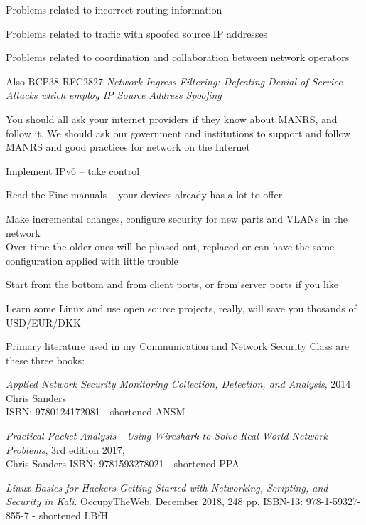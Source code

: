\documentclass[Screen16to9,17pt]{foils}
\begin{document}
\begin{list2}
\item Problems related to incorrect routing information
\item Problems related to traffic with spoofed source IP addresses
\item Problems related to coordination and collaboration between network operators
\item Also BCP38 RFC2827 \emph{Network Ingress Filtering: Defeating Denial of Service Attacks
which employ IP Source Address Spoofing}
\end{list2}

You should all ask your internet providers if they know about MANRS, and follow it. We should ask our government and institutions to support and follow MANRS and good practices for network on the Internet





\begin{list2}
\item Implement IPv6 -- take control
\item Read the Fine manuals -- your devices already has a lot to offer
\item Make incremental changes, configure security for new parts and VLANs in the network\\
Over time the older ones will be phased out, replaced or can have the same configuration applied with little trouble
\item Start from the bottom and from client ports, or from server ports if you like
\item Learn some Linux and use open source projects, really, will save you thosands of USD/EUR/DKK
\end{list2}

\myquestionspage


Primary literature used in my Communication and Network Security Class
are these three books:
\begin{list2}
\item \emph{Applied Network Security Monitoring Collection, Detection, and Analysis}, 2014 Chris Sanders \\
ISBN: 9780124172081 - shortened ANSM
\item \emph{Practical Packet Analysis - Using Wireshark to Solve Real-World Network Problems}, 3rd edition 2017, \\
Chris Sanders ISBN: 9781593278021 - shortened PPA
\item \emph{Linux Basics for Hackers Getting Started with Networking, Scripting, and Security in Kali}. OccupyTheWeb, December 2018, 248 pp. ISBN-13: 978-1-59327-855-7 - shortened LBfH
\end{list2}
\end{document}
